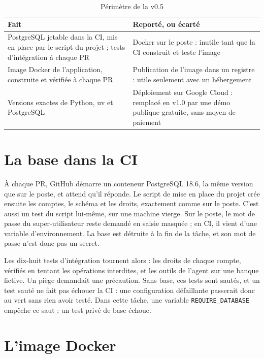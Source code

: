 \documentclass[11pt,a4paper]{article}
\begin{document}
\begin{table}[H]
\centering\small
\begin{tabularx}{\linewidth}{@{}Y Y@{}}
\toprule
Fait & Reporté, ou écarté \\
\midrule
PostgreSQL jetable dans la CI, mis en place par le script du projet ; tests d'intégration à chaque PR & Docker sur le poste : inutile tant que la CI construit et teste l'image \\
Image Docker de l'application, construite et vérifiée à chaque PR & Publication de l'image dans un registre : utile seulement avec un hébergement \\
Versions exactes de Python, uv et PostgreSQL & Déploiement sur Google Cloud : remplacé en v1.0 par une démo publique gratuite, sans moyen de paiement \\
\bottomrule
\end{tabularx}
\caption{Périmètre de la v0.5}
\end{table}

\section{La base dans la CI}

À chaque PR, GitHub démarre un conteneur PostgreSQL 18.6, la même version que sur le poste, et attend qu'il réponde. Le script de mise en place du projet crée ensuite les comptes, le schéma et les droits, exactement comme sur le poste. C'est aussi un test du script lui-même, sur une machine vierge. Sur le poste, le mot de passe du super-utilisateur reste demandé en saisie masquée ; en CI, il vient d'une variable d'environnement. La base est détruite à la fin de la tâche, et son mot de passe n'est donc pas un secret.

Les dix-huit tests d'intégration tournent alors : les droits de chaque compte, vérifiés en tentant les opérations interdites, et les outils de l'agent sur une banque fictive. Un piège demandait une précaution. Sans base, ces tests sont sautés, et un test sauté ne fait pas échouer la CI : une configuration défaillante passerait donc au vert sans rien avoir testé. Dans cette tâche, une variable \texttt{REQUIRE\_DATABASE} empêche ce saut ; un test privé de base échoue.

\section{L'image Docker}
\end{document}
